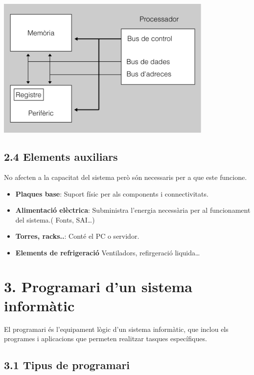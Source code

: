 \documentclass[
  12 pt,
  a4paper,
]{article}
\providecommand{\tightlist}{%
  \setlength{\itemsep}{0pt}\setlength{\parskip}{0pt}}
\begin{document}
\includegraphics[width=0.8\textwidth,height=\textheight]{recursos/esquema.png}

\subsection{2.4 Elements auxiliars}\label{elements-auxiliars}

No afecten a la capacitat del sistema però són necessaris per a que este
funcione.

\begin{itemize}
\tightlist
\item
  \textbf{Plaques base}: Suport físic per als components i
  connectivitats.
\item
  \textbf{Alimentació elèctrica}: Subministra l'energia necessària per
  al funcionament del sistema.( Fonts, SAI\ldots)
\item
  \textbf{Torres, racks..}: Conté el PC o servidor.
\item
  \textbf{Elements de refrigeració} Ventiladors, refirgeració
  liquida\ldots{}
\end{itemize}

\section{3. Programari d'un sistema
informàtic}\label{programari-dun-sistema-informuxe0tic}

El programari és l'equipament lògic d'un sistema informàtic, que inclou
els programes i aplicacions que permeten realitzar tasques específiques.

\subsection{3.1 Tipus de programari}\label{tipus-de-programari}
\end{document}
